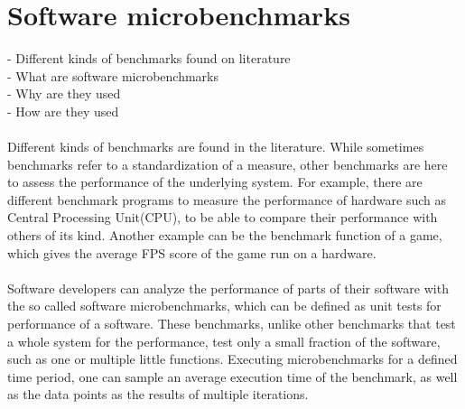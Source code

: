 \documentclass{seal_thesis}
\begin{document}
\section{Software microbenchmarks}
- Different kinds of benchmarks found on literature \\
- What are software microbenchmarks \\
- Why are they used \\
- How are they used \\
\\
Different kinds of benchmarks are found in the literature. While sometimes benchmarks refer to a standardization of a measure, other benchmarks are here to assess the performance of the underlying system. For example, there are different benchmark programs to measure the performance of hardware such as Central Processing Unit(CPU), to be able to compare their performance with others of its kind. Another example can be the benchmark function of a game, which gives the average FPS score of the game run on a hardware.\\
\\
Software developers can analyze the performance of parts of their software with the so called software microbenchmarks, which can be defined as unit tests for performance of a software. These benchmarks, unlike other benchmarks that test a whole system for the performance, test only a small fraction of the software, such as one or multiple little functions.
Executing microbenchmarks for a defined time period, one can sample an average execution
time of the benchmark, as well as the data points as the results of multiple iterations.
\end{document}
